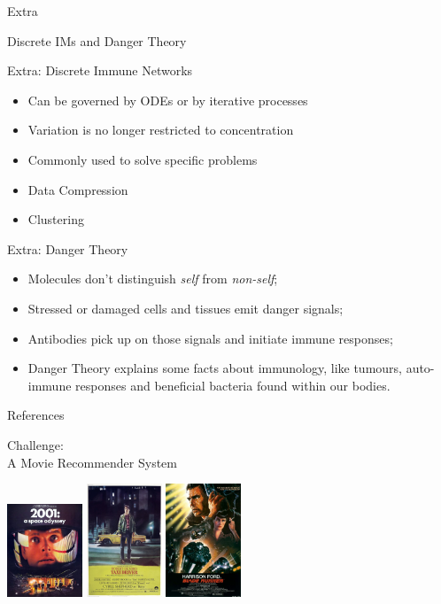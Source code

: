 \documentclass[xcolor=svgnames]{beamer}
\newcommand{\introframe}[2]{
    \begin{frame}
       \vfill
       \hfill\Huge{#1}
       
       \vspace{1em}
       
       \hfill\Large{#2}
       \vfill
    \end{frame}
}
\begin{document}
    \introframe{Extra}{Discrete IMs and Danger Theory}
    
    \begin{frame}{Extra: Discrete Immune Networks}
        \begin{itemize}
            \item Can be governed by ODEs or by iterative processes
            \item Variation is no longer restricted to concentration
            \item Commonly used to solve specific problems
            \item Data Compression 
            \item Clustering
        \end{itemize}
    \end{frame}
    
    \begin{frame}{Extra: Danger Theory}
        \begin{itemize}
            \item Molecules don't distinguish \textit{self} from \textit{non-self};
            \item Stressed or damaged cells and tissues emit danger signals;
            \item Antibodies pick up on those signals and initiate immune responses;
            \item Danger Theory explains some facts about immunology, like tumours, auto-immune responses and beneficial bacteria found within our bodies.
        \end{itemize}
    \end{frame}
    
    \begin{frame}{References}
        
        
        \nocite{*}
    \end{frame}     
            
    \introframe{Challenge:\\ \hfill \Large{A Movie Recommender System}}{ 
        \includegraphics[width=85px]{fig/2001-poster}
        \hfill
        \includegraphics[width=85px]{fig/taxidriverposter}
        \hfill
        \includegraphics[width=85px]{fig/blade_runner}}
        
\end{document}
